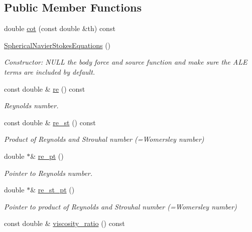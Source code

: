 \subsection*{Public Member Functions}
\begin{DoxyCompactItemize}
\item 
double \hyperlink{classoomph_1_1SphericalNavierStokesEquations_a8a160b5a04c9ba5bab06f3b2b184499f}{cot} (const double \&th) const
\item 
\hyperlink{classoomph_1_1SphericalNavierStokesEquations_adb7856b86fa6d5d35b03596649c86a70}{Spherical\+Navier\+Stokes\+Equations} ()
\begin{DoxyCompactList}\small\item\em Constructor\+: N\+U\+LL the body force and source function and make sure the A\+LE terms are included by default. \end{DoxyCompactList}\item 
const double \& \hyperlink{classoomph_1_1SphericalNavierStokesEquations_a339dc121adc8a2eb62805ac63171fd6c}{re} () const
\begin{DoxyCompactList}\small\item\em Reynolds number. \end{DoxyCompactList}\item 
const double \& \hyperlink{classoomph_1_1SphericalNavierStokesEquations_af3627c5846c81dacdfb150576a28db61}{re\+\_\+st} () const
\begin{DoxyCompactList}\small\item\em Product of Reynolds and Strouhal number (=Womersley number) \end{DoxyCompactList}\item 
double $\ast$\& \hyperlink{classoomph_1_1SphericalNavierStokesEquations_a2ee12f1bb031d2bc22db89daa341ffb9}{re\+\_\+pt} ()
\begin{DoxyCompactList}\small\item\em Pointer to Reynolds number. \end{DoxyCompactList}\item 
double $\ast$\& \hyperlink{classoomph_1_1SphericalNavierStokesEquations_ac626bfa171be369005086f0d398d4053}{re\+\_\+st\+\_\+pt} ()
\begin{DoxyCompactList}\small\item\em Pointer to product of Reynolds and Strouhal number (=Womersley number) \end{DoxyCompactList}\item 
const double \& \hyperlink{classoomph_1_1SphericalNavierStokesEquations_afe25a15c1ed202d735ca335b80b1202a}{viscosity\+\_\+ratio} () const

\end{DoxyCompactItemize}
